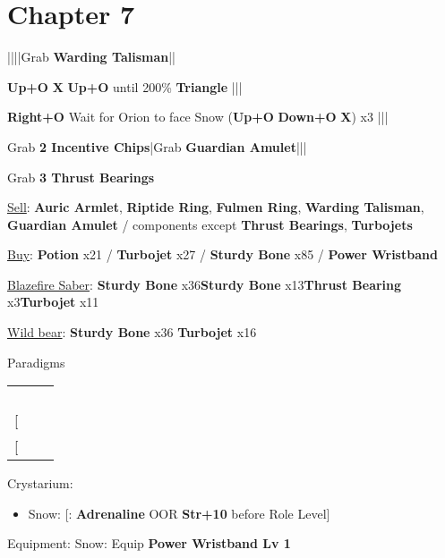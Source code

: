 \section{Chapter 7}
\begin{mainlist}
	\item {}|\skip|\skip|\skip|Grab \textbf{Warding Talisman}|\skip|
	\item {} \textbf{Up+O} \to \textbf{X} \to \textbf{Up+O} until 200\% \to \textbf{Triangle} |\skip||
	\item {} \textbf{Right+O} \to Wait for Orion to face Snow \to (\textbf{Up+O} \to \textbf{Down+O} \to \textbf{X}) x3 |\skip||
	\item Grab \textbf{2 Incentive Chips}|Grab \textbf{Guardian Amulet}|\skip||\skip
	\item Grab \textbf{3 Thrust Bearings}
\end{mainlist}
\begin{shop}{\shopitem}
	\item \underline{Sell}: \textbf{Auric Armlet}, \textbf{Riptide Ring}, \textbf{Fulmen Ring}, \textbf{Warding Talisman}, \textbf{Guardian Amulet} / components except \textbf{Thrust Bearings}, \textbf{Turbojets}
	\item \underline{Buy}: \textbf{Potion} x21 / \textbf{Turbojet} x27 / \textbf{Sturdy Bone} x85 / \textbf{Power Wristband}
\end{shop}
\begin{upgrade}
	\item \underline{Blazefire Saber}: \textbf{Sturdy Bone} x36\to\textbf{Sturdy Bone} x13\to\textbf{Thrust Bearing} x3\to\textbf{Turbojet} x11
	\item \underline{Wild bear}: \textbf{Sturdy Bone} x36 \to \textbf{Turbojet} x16
\end{upgrade}
\begin{menu}
	\item Paradigms
	\begin{tabular}{ccl}
		\com       & \rav &  \\
		\com       & \med &          \\
		\sen       & \med &          \\
		\sen       & \syn &          \\
		{[}\rav{]} & \rav &          \\
		{[}\rav{]} & \rav &
	\end{tabular}
	\item Crystarium:
	\begin{itemize}
		\item Snow: [\com: \textbf{Adrenaline} OOR \to \textbf{Str+10} before Role Level]
	\end{itemize}
	\item Equipment: Snow: Equip \textbf{Power Wristband Lv 1}
\end{menu}
